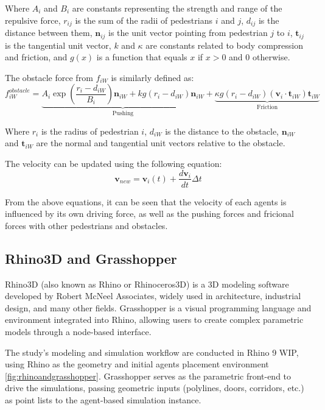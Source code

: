 Where \(A_i\) and \(B_i\) are constants representing the strength and range of the repulsive force, \(r_{ij}\) is the sum of the radii of pedestrians \(i\) and \(j\), \(d_{ij}\) is the distance between them, \(\mathbf{n}_{ij}\) is the unit vector pointing from pedestrian \(j\) to \(i\), \(\mathbf{t}_{ij}\) is the tangential unit vector, \(k\) and \(\kappa\) are constants related to body compression and friction, and \(g(x)\) is a function that equals \(x\) if \(x > 0\) and 0 otherwise.

The obstacle force from  \(f_{iW}\) is similarly defined as:
\begin{equation}
    f_{iW}^{obstacle} = \underbrace{A_i \exp\left(\frac{r_i - d_{iW}}{B_i}\right) \mathbf{n}_{iW} + k g(r_i - d_{iW}) \mathbf{n}_{iW}}_{\text{Pushing}} + \underbrace{\kappa g(r_i - d_{iW}) (\mathbf{v}_i \cdot \mathbf{t}_{iW}) \mathbf{t}_{iW}}_{\text{Friction}}
\end{equation}

Where \(r_i\) is the radius of pedestrian \(i\), \(d_{iW}\) is the distance to the obstacle, \(\mathbf{n}_{iW}\) and \(\mathbf{t}_{iW}\) are the normal and tangential unit vectors relative to the obstacle.

The velocity can be updated using the following equation:
\begin{equation}
    \boldsymbol{v}_{new} = \boldsymbol{v}_i(t) + \frac{d\boldsymbol{v}_i}{dt} \Delta t
\end{equation}

From the above equations, it can be seen that the velocity of each agents is influenced by its own driving force, as well as the pushing forces and fricional forces with other pedestrians and obstacles. 

\subsection{Rhino3D and Grasshopper}
Rhino3D \cite{RhinoRhinoceros3D} (also known as Rhino or Rhinoceros3D) is a 3D modeling software developed by Robert McNeel Associates, widely used in architecture, industrial design, and many other fields. Grasshopper is a visual programming language and environment integrated into Rhino, allowing users to create complex parametric models through a node-based interface.

The study's modeling and simulation workflow are conducted in Rhino 9 WIP, using Rhino as the geometry and initial agents placement environment \ref{fig:rhinoandgrasshopper}. Grasshopper serves as the parametric front-end to drive the simulations, passing geometric inputs (polylines, doors, corridors, etc.) as point lists to the agent-based simulation instance.

